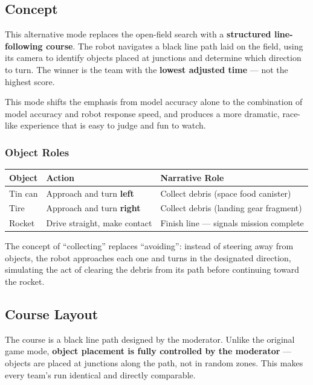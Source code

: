 \documentclass[11pt,a4paper]{article}
\begin{document}
\subsection{Concept}

This alternative mode replaces the open-field search with a \textbf{structured line-following course}. The robot navigates a black line path laid on the field, using its camera to identify objects placed at junctions and determine which direction to turn. The winner is the team with the \textbf{lowest adjusted time} — not the highest score.

This mode shifts the emphasis from model accuracy alone to the combination of model accuracy and robot response speed, and produces a more dramatic, race-like experience that is easy to judge and fun to watch.

\subsubsection*{Object Roles}

\begin{center}
\begin{tabular}{|l|l|l|}
\hline
\textbf{Object} & \textbf{Action} & \textbf{Narrative Role} \\
\hline
Tin can  & Approach and turn \textbf{left}     & Collect debris (space food canister) \\
Tire     & Approach and turn \textbf{right}    & Collect debris (landing gear fragment) \\
Rocket   & Drive straight, make contact        & Finish line — signals mission complete \\
\hline
\end{tabular}
\end{center}

The concept of ``collecting'' replaces ``avoiding'': instead of steering away from objects, the robot approaches each one and turns in the designated direction, simulating the act of clearing the debris from its path before continuing toward the rocket.

\subsection{Course Layout}

The course is a black line path designed by the moderator. Unlike the original game mode, \textbf{object placement is fully controlled by the moderator} — objects are placed at junctions along the path, not in random zones. This makes every team's run identical and directly comparable.
\end{document}
